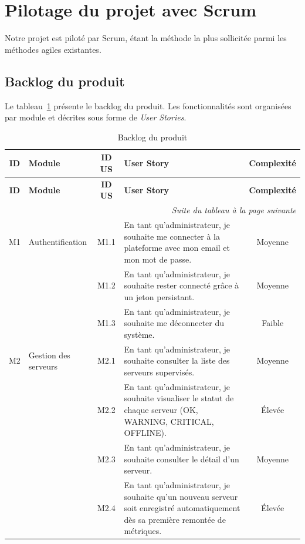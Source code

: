 \section{Pilotage du projet avec Scrum}
Notre projet est piloté par Scrum, étant la méthode la plus sollicitée parmi les
méthodes agiles existantes.

\subsection{Backlog du produit}
Le tableau~\ref{tab:backlog-produit} présente le backlog du produit. Les fonctionnalités
sont organisées par module et décrites sous forme de \textit{User Stories}.

\renewcommand{\arraystretch}{1.5}
\begin{longtable}{|c|>{\raggedright\arraybackslash}p{2.6cm}|c|>{\raggedright\arraybackslash}p{6.2cm}|c|}
\hline
\textbf{ID} & \textbf{Module} & \textbf{ID US} & \centering\arraybackslash\textbf{User Story} & \textbf{Complexité} \\
\hline
\endfirsthead

\hline
\textbf{ID} & \textbf{Module} & \textbf{ID US} & \centering\arraybackslash\textbf{User Story} & \textbf{Complexité} \\
\hline
\endhead

\hline
\multicolumn{5}{r}{\textit{Suite du tableau à la page suivante}} \\
\endfoot

\hline
\caption{Backlog du produit}
\label{tab:backlog-produit}
\endlastfoot

M1 & Authentification
& M1.1 & En tant qu'administrateur, je souhaite me connecter à la plateforme avec mon email et mon mot de passe. & Moyenne \\
& & M1.2 & En tant qu'administrateur, je souhaite rester connecté grâce à un jeton persistant. & Moyenne \\
& & M1.3 & En tant qu'administrateur, je souhaite me déconnecter du système. & Faible \\
\hline

M2 & Gestion des serveurs
& M2.1 & En tant qu'administrateur, je souhaite consulter la liste des serveurs supervisés. & Moyenne \\
& & M2.2 & En tant qu'administrateur, je souhaite visualiser le statut de chaque serveur (OK, WARNING, CRITICAL, OFFLINE). & Élevée \\
& & M2.3 & En tant qu'administrateur, je souhaite consulter le détail d'un serveur. & Moyenne \\
& & M2.4 & En tant qu'administrateur, je souhaite qu'un nouveau serveur soit enregistré automatiquement dès sa première remontée de métriques. & Élevée \\
\hline


\end{longtable}
